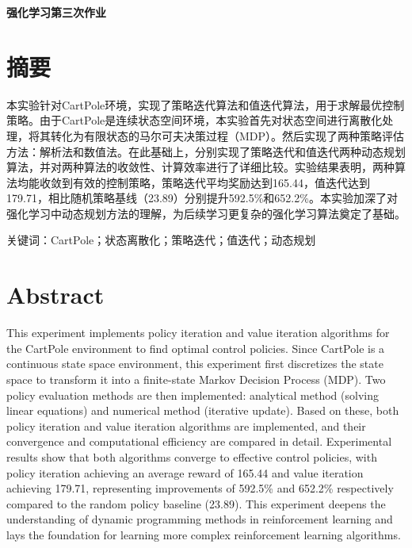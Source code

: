 \documentclass[12pt,a4paper]{article}
\begin{document}
\begin{center}
{\heiti\fontsize{18pt}{22pt}\selectfont\bfseries 强化学习第三次作业}
\end{center}

\section*{摘要}

{\songti\fontsize{12pt}{15pt}\selectfont 本实验针对CartPole环境，实现了策略迭代算法和值迭代算法，用于求解最优控制策略。由于CartPole是连续状态空间环境，本实验首先对状态空间进行离散化处理，将其转化为有限状态的马尔可夫决策过程（MDP）。然后实现了两种策略评估方法：解析法和数值法。在此基础上，分别实现了策略迭代和值迭代两种动态规划算法，并对两种算法的收敛性、计算效率进行了详细比较。实验结果表明，两种算法均能收敛到有效的控制策略，策略迭代平均奖励达到165.44，值迭代达到179.71，相比随机策略基线（23.89）分别提升592.5\%和652.2\%。本实验加深了对强化学习中动态规划方法的理解，为后续学习更复杂的强化学习算法奠定了基础。}

\vspace{0.5em}
{\heiti\fontsize{12pt}{15pt}\selectfont 关键词：}{\songti\fontsize{12pt}{15pt}\selectfont CartPole；状态离散化；策略迭代；值迭代；动态规划}

\section*{Abstract}

{\fontsize{12pt}{15pt}\selectfont This experiment implements policy iteration and value iteration algorithms for the CartPole environment to find optimal control policies. Since CartPole is a continuous state space environment, this experiment first discretizes the state space to transform it into a finite-state Markov Decision Process (MDP). Two policy evaluation methods are then implemented: analytical method (solving linear equations) and numerical method (iterative update). Based on these, both policy iteration and value iteration algorithms are implemented, and their convergence and computational efficiency are compared in detail. Experimental results show that both algorithms converge to effective control policies, with policy iteration achieving an average reward of 165.44 and value iteration achieving 179.71, representing improvements of 592.5\% and 652.2\% respectively compared to the random policy baseline (23.89). This experiment deepens the understanding of dynamic programming methods in reinforcement learning and lays the foundation for learning more complex reinforcement learning algorithms.}
\end{document}
